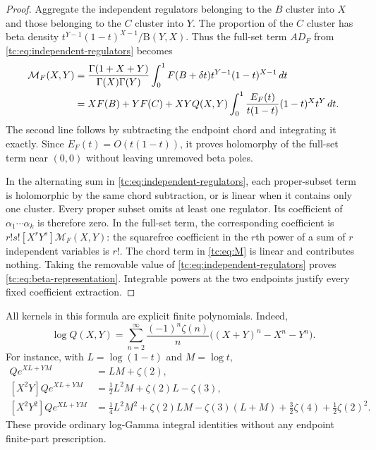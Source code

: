 \begin{proof}
Aggregate the independent regulators belonging to the $B$ cluster
into $X$ and those belonging to the $C$ cluster into $Y$.  The
proportion of the $C$ cluster has beta density
$t^{Y-1}(1-t)^{X-1}/\mathrm B(Y,X)$.  Thus the full-set term
$AD_F$ from \eqref{tc:eq:independent-regulators} becomes
\begin{align}
 \mathcal M_F(X,Y)
 &=\frac{\Gamma(1+X+Y)}{\Gamma(X)\Gamma(Y)}
     \int_0^1 F(B+\delta t)t^{Y-1}(1-t)^{X-1}\,dt\notag\\
 &=XF(B)+YF(C)
   +XYQ(X,Y)\int_0^1
          \frac{E_F(t)}{t(1-t)}(1-t)^Xt^Y\,dt.
                                                     \label{tc:eq:M}
\end{align}
The second line follows by subtracting the endpoint chord and
integrating it exactly.  Since $E_F(t)=O(t(1-t))$, it proves
holomorphy of the full-set term near $(0,0)$ without leaving
unremoved beta poles.

In the alternating sum in \eqref{tc:eq:independent-regulators},
each proper-subset term is holomorphic by the same chord
subtraction, or is linear when it contains only one cluster.
Every proper subset omits at least one regulator.  Its coefficient
of $\alpha_1\cdots\alpha_k$ is therefore zero.  In the full-set term,
the corresponding coefficient is
$r!s![X^rY^s]\mathcal M_F(X,Y)$: the squarefree coefficient in the
$r$th power of a sum of $r$ independent variables is $r!$.
The chord term in \eqref{tc:eq:M} is linear and contributes nothing.
Taking the removable value of
\eqref{tc:eq:independent-regulators} proves
\eqref{tc:eq:beta-representation}.  Integrable powers at the two
endpoints justify every fixed coefficient extraction.
\end{proof}

All kernels in this formula are explicit finite polynomials.  Indeed,
\begin{equation}\label{tc:eq:logQ}
 \log Q(X,Y)=\sum_{n=2}^{\infty}
  \frac{(-1)^n\zeta(n)}n
      \bigl((X+Y)^n-X^n-Y^n\bigr).
\end{equation}
For instance, with $L=\log(1-t)$ and $M=\log t$,
\begin{align}
 [XY]Qe^{XL+YM}&=LM+\zeta(2),\label{tc:eq:kernel22}\\
 [X^2Y]Qe^{XL+YM}&=\tfrac12L^2M+\zeta(2)L-\zeta(3),\\
 [X^2Y^2]Qe^{XL+YM}
  &=\tfrac14L^2M^2+\zeta(2)LM-\zeta(3)(L+M)
      +\tfrac32\zeta(4)+\tfrac12\zeta(2)^2.
\end{align}
These provide ordinary log-Gamma integral identities without any
endpoint finite-part prescription.

